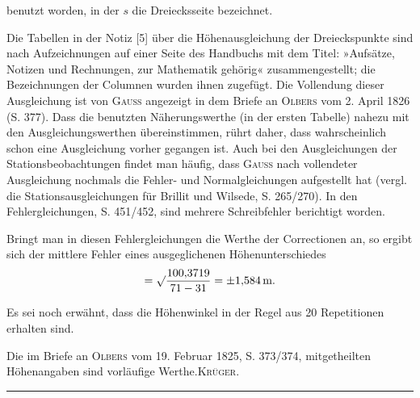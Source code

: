 \noindent benutzt worden, in der \(s\) die Dreiecksseite bezeichnet.
\par\noindent\hspace*{\parindent}Die Tabellen in der Notiz [5] über die Höhenausgleichung der
Dreieckspunkte sind nach Aufzeichnungen auf einer Seite des Handbuchs mit dem Titel:
»Aufsätze, Notizen und Rechnungen, zur Mathematik gehörig« zusammengestellt;
die Bezeichnungen der Columnen wurden ihnen zugefügt. Die Vollendung dieser
Ausgleichung ist von \textsc{Gauss} angezeigt in dem Briefe an \textsc{Olbers} vom
2. April 1826 (S. 377). Dass die benutzten Näherungswerthe (in der ersten Tabelle)
nahezu mit den Ausgleichungswerthen übereinstimmen, rührt daher, dass wahrscheinlich
schon eine Ausgleichung vorher gegangen ist. Auch bei den Ausgleichungen der
Stationsbeobachtungen findet man häufig, dass \textsc{Gauss} nach vollendeter
Ausgleichung nochmals die Fehler- und Normalgleichungen aufgestellt hat
(vergl. die Stationsausgleichungen für Brillit und Wilsede, S. 265/270).
In den Fehlergleichungen, S. 451/452, sind mehrere Schreibfehler berichtigt worden.
\par\noindent\hspace*{\parindent}Bringt man in diesen Fehlergleichungen die Werthe der Correctionen an,
so ergibt sich der mittlere Fehler eines ausgeglichenen Höhenunterschiedes
\[
=\surd\frac{100{,}3719}{71-31}=\pm1{,}584\,\text{m}.
\]
\par\noindent\hspace*{\parindent}Es sei noch erwähnt, dass die Höhenwinkel in der Regel aus
20 Repetitionen erhalten sind.
\par\noindent\hspace*{\parindent}Die im Briefe an \textsc{Olbers} vom 19. Februar 1825, S. 373/374,
mitgetheilten Höhenangaben sind vorläufige Werthe.\hfill\textsc{Krüger.}\par
\endgroup
\par\medskip
\begin{center}\rule{.24\linewidth}{.4pt}\end{center}


